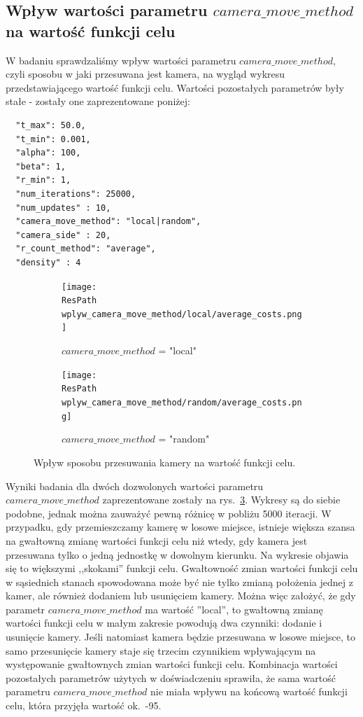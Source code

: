 \documentclass[12pt,a4paper]{article}
\newcommand{\ResPath}{../badania/}
\begin{document}
\subsection{Wpływ wartości parametru $camera\_move\_method$ na wartość funkcji celu}
W badaniu sprawdzaliśmy wpływ wartości parametru $camera\_move\_method$,
czyli sposobu w jaki przesuwana jest kamera, na wygląd wykresu przedstawiającego wartość funkcji celu.
Wartości pozostałych parametrów były stałe - zostały one zaprezentowane poniżej:

\begin{lstlisting}
  "t_max": 50.0,
  "t_min": 0.001,
  "alpha": 100,
  "beta": 1,
  "r_min": 1,
  "num_iterations": 25000,
  "num_updates" : 10,
  "camera_move_method": "local|random",
  "camera_side" : 20,
  "r_count_method": "average",
  "density" : 4
\end{lstlisting}
\begin{figure}[htb]
  \begin{subfigure}[b]{0.5\linewidth}
    \centering
    \texttt{[image: \\ResPath wplyw\_camera\_move\_method/local/average\_costs.png]} 
    \caption{$camera\_move\_method$ = "local"} 
    \label{fig_cam_move_method:a} 
  \end{subfigure}%
  \begin{subfigure}[b]{0.5\linewidth}
    \texttt{[image: \\ResPath wplyw\_camera\_move\_method/random/average\_costs.png]} 
    \caption{$camera\_move\_method$ = "random"} 
    \label{fig_cam_move_method:b} 
  \end{subfigure} 
  \caption{Wpływ sposobu przesuwania kamery na wartość funkcji celu.}
  \label{fig_cam_move_method} 
\end{figure}
Wyniki badania dla dwóch dozwolonych wartości parametru $camera\_move\_method$
zaprezentowane zostały na rys.\ \ref{fig_cam_move_method}. Wykresy są do siebie
podobne, jednak można zauważyć pewną różnicę w pobliżu 5000 iteracji.
W przypadku, gdy przemieszczamy kamerę w losowe miejsce, istnieje większa
szansa na gwałtowną zmianę wartości funkcji celu niż wtedy, gdy kamera jest
przesuwana tylko o jedną jednostkę w dowolnym kierunku. Na wykresie objawia się
to większymi ,,skokami'' funkcji celu. Gwałtowność zmian wartości funkcji celu
w sąsiednich stanach spowodowana może być nie tylko zmianą położenia jednej z kamer,
ale również dodaniem lub usunięciem kamery. Można więc założyć, że gdy
parametr $camera\_move\_method$ ma wartość ''local'', to gwałtowną zmianę
wartości funkcji celu w małym zakresie powodują dwa czynniki: dodanie i usunięcie
kamery. Jeśli natomiast kamera będzie przesuwana w losowe miejsce, to samo
przesunięcie kamery staje się trzecim czynnikiem wpływającym na występowanie
gwałtownych zmian wartości funkcji celu. Kombinacja wartości pozostałych
parametrów użytych w doświadczeniu sprawiła, że sama wartość parametru
$camera\_move\_method$ nie miała wpływu na końcową wartość funkcji celu,
która przyjęła wartość ok.\ -95.
\end{document}
